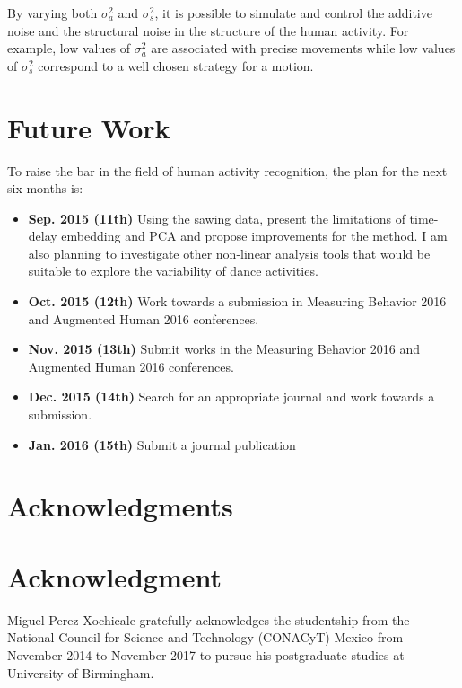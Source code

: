 \documentclass[10pt,journal,compsoc]{IEEEtran}
\begin{document}
By varying both $\sigma_a ^2$ and $\sigma_s ^2$,
it is possible to simulate and control the additive noise and the structural noise
in the structure of the human activity. For example, low values of $\sigma_a ^2$
are associated with precise movements while low values of $\sigma_s ^2$ correspond
to a well chosen strategy for a motion.



\section{Future Work}
To raise the bar in the field of human activity recognition,
the plan for the next six months is:

\begin{itemize}
\item \textbf{Sep. 2015 (11th)}  Using the sawing data, present the limitations of
    time-delay embedding and PCA and propose improvements for the method.
    I am also planning to investigate other non-linear analysis tools that would be suitable
	to explore the variability of dance activities.
 \item \textbf{Oct. 2015 (12th)} Work towards a submission in Measuring Behavior 2016 and Augmented Human 2016 conferences.
 \item \textbf{Nov. 2015 (13th)} Submit works in the Measuring Behavior 2016 and Augmented Human 2016 conferences.
 \item \textbf{Dec. 2015 (14th)} Search for an appropriate journal and work towards a submission.
 \item \textbf{Jan. 2016 (15th)} Submit a journal publication
\end{itemize}


\ifCLASSOPTIONcompsoc
  \section*{Acknowledgments}
\else
  \section*{Acknowledgment}
\fi

Miguel Perez-Xochicale gratefully acknowledges the studentship from
the National Council for Science and Technology (CONACyT) Mexico
from November 2014 to November 2017 to pursue his postgraduate studies
at University of Birmingham.
\end{document}
